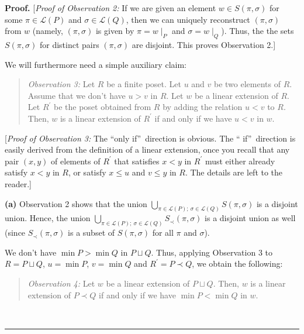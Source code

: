 \documentclass[numbers=enddot,12pt,final,onecolumn,notitlepage]{scrartcl}%
\theoremstyle{definition}
\newenvironment{statement}{\begin{quote}}{\end{quote}}
\newenvironment{proof}[1][Proof]{\noindent\textbf{#1.} }{\ \rule{0.5em}{0.5em}}
\newenvironment{verlong}{}{}
\begin{document}
\begin{verlong}
\begin{proof}
[\textit{Proof of Observation 2:} If we are given an element $w\in S\left(
\pi,\sigma\right)  $ for some $\pi\in\mathcal{L}\left(  P\right)  $ and
$\sigma\in\mathcal{L}\left(  Q\right)  $, then we can uniquely reconstruct
$\left(  \pi,\sigma\right)  $ from $w$ (namely, $\left(  \pi,\sigma\right)  $
is given by $\pi=w\mid_{P}$ and $\sigma=w\mid_{Q}$). Thus, the the sets
$S\left(  \pi,\sigma\right)  $ for distinct pairs $\left(  \pi,\sigma\right)
$ are disjoint. This proves Observation 2.]

We will furthermore need a simple auxiliary claim:

\begin{statement}
\textit{Observation 3:} Let $R$ be a finite poset. Let $u$ and $v$ be two
elements of $R$. Assume that we don't have $u>v$ in $R$. Let $w$ be a linear
extension of $R$. Let $R^{\prime}$ be the poset obtained from $R$ by adding
the relation $u<v$ to $R$. Then, $w$ is a linear extension of $R^{\prime}$ if
and only if we have $u<v$ in $w$.
\end{statement}

[\textit{Proof of Observation 3:} The \textquotedblleft only
if\textquotedblright\ direction is obvious. The \textquotedblleft
if\textquotedblright\ direction is easily derived from the definition of a
linear extension, once you recall that any pair $\left(  x,y\right)  $ of
elements of $R^{\prime}$ that satisfies $x<y$ in $R^{\prime}$ must either
already satisfy $x<y$ in $R$, or satisfy $x\leq u$ and $v\leq y$ in $R$. The
details are left to the reader.]

\textbf{(a)} Observation 2 shows that the union $\bigcup_{\pi\in
\mathcal{L}\left(  P\right)  ;\ \sigma\in\mathcal{L}\left(  Q\right)
}S\left(  \pi,\sigma\right)  $ is a disjoint union. Hence, the union
$\bigcup_{\pi\in\mathcal{L}\left(  P\right)  ;\ \sigma\in\mathcal{L}\left(
Q\right)  }S_{\prec}\left(  \pi,\sigma\right)  $ is a disjoint union as well
(since $S_{\prec}\left(  \pi,\sigma\right)  $ is a subset of $S\left(
\pi,\sigma\right)  $ for all $\pi$ and $\sigma$).

We don't have $\min P>\min Q$ in $P\sqcup Q$. Thus, applying Observation 3 to
$R=P\sqcup Q$, $u=\min P$, $v=\min Q$ and $R^{\prime}=P\left.  \prec\right.
Q$, we obtain the following:

\begin{statement}
\textit{Observation 4:} Let $w$ be a linear extension of $P\sqcup Q$. Then,
$w$ is a linear extension of $P\left.  \prec\right.  Q$ if and only if we have
$\min P<\min Q$ in $w$.
\end{statement}


\end{proof}
\end{verlong}
\end{document}
